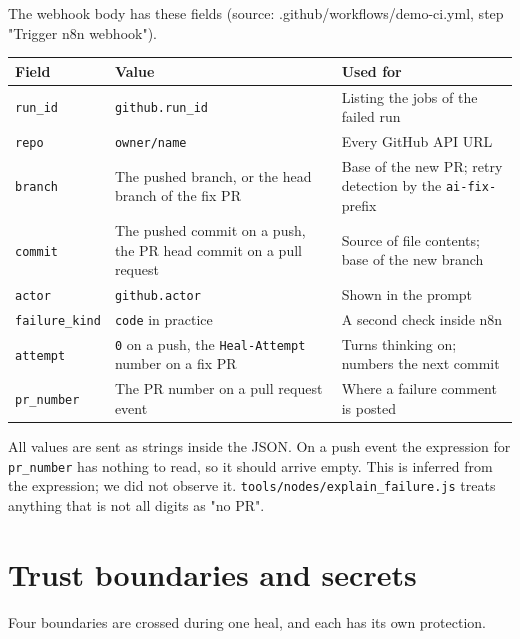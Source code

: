 \documentclass[11pt,a4paper]{report}
\begin{document}
The webhook body has these fields (source: .github/workflows/demo-ci.yml, step "Trigger n8n webhook").

\begin{longtable}{>{\raggedright\arraybackslash}p{0.105\dimexpr\linewidth-6\tabcolsep\relax}>{\raggedright\arraybackslash}p{0.451\dimexpr\linewidth-6\tabcolsep\relax}>{\raggedright\arraybackslash}p{0.444\dimexpr\linewidth-6\tabcolsep\relax}}
\toprule
\textbf{Field} & \textbf{Value} & \textbf{Used for} \\
\midrule
\endhead
\texttt{run\_\allowbreak{}id} & \texttt{github.\allowbreak{}run\_\allowbreak{}id} & Listing the jobs of the failed run \\
\texttt{repo} & \texttt{owner/\allowbreak{}name} & Every GitHub API URL \\
\texttt{branch} & The pushed branch, or the head branch of the fix PR & Base of the new PR; retry detection by the \texttt{ai-\allowbreak{}fix-\allowbreak{}} prefix \\
\texttt{commit} & The pushed commit on a push, the PR head commit on a pull request & Source of file contents; base of the new branch \\
\texttt{actor} & \texttt{github.\allowbreak{}actor} & Shown in the prompt \\
\texttt{failure\_\allowbreak{}kind} & \texttt{code} in practice & A second check inside n8n \\
\texttt{attempt} & \texttt{0} on a push, the \texttt{Heal-\allowbreak{}Attempt} number on a fix PR & Turns thinking on; numbers the next commit \\
\texttt{pr\_\allowbreak{}number} & The PR number on a pull request event & Where a failure comment is posted \\
\bottomrule
\end{longtable}

All values are sent as strings inside the JSON. On a push event the expression for \texttt{pr\_\allowbreak{}number} has nothing to read, so it should arrive empty. This is inferred from the expression; we did not observe it. \texttt{tools/\allowbreak{}nodes/\allowbreak{}explain\_\allowbreak{}failure.\allowbreak{}js} treats anything that is not all digits as "no PR".

\section{Trust boundaries and secrets}

Four boundaries are crossed during one heal, and each has its own protection.
\end{document}
